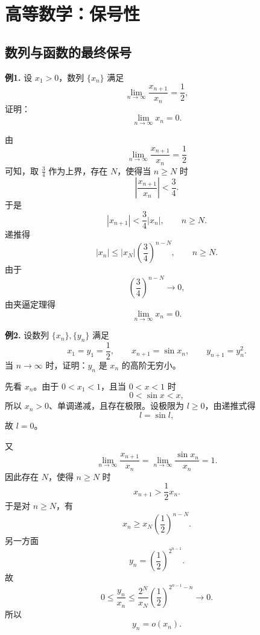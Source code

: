 \chapter{高等数学：保号性}

\section{数列与函数的最终保号}

\begin{problemblock}
\textbf{例1.} 设 \(x_1>0\)，数列 \(\{x_n\}\) 满足
\[
\lim_{n\to\infty}\frac{x_{n+1}}{x_n}=\frac12,
\]
证明：
\[
\lim_{n\to\infty}x_n=0.
\]
\end{problemblock}
\begin{solutionblock}
由
\[
\lim_{n\to\infty}\frac{x_{n+1}}{x_n}=\frac12
\]
可知，取 \(\frac34\) 作为上界，存在 \(N\)，使得当 \(n\ge N\) 时
\[
\left|\frac{x_{n+1}}{x_n}\right|<\frac34.
\]
于是
\[
|x_{n+1}|<\frac34|x_n|,\qquad n\ge N.
\]
递推得
\[
|x_n|\le |x_N|\left(\frac34\right)^{n-N},\qquad n\ge N.
\]
由于
\[
\left(\frac34\right)^{n-N}\to0,
\]
由夹逼定理得
\[
\lim_{n\to\infty}x_n=0.
\]
\end{solutionblock}

\begin{problemblock}
\textbf{例2.} 设数列 \(\{x_n\},\{y_n\}\) 满足
\[
x_1=y_1=\frac12,\qquad x_{n+1}=\sin x_n,\qquad y_{n+1}=y_n^2.
\]
当 \(n\to\infty\) 时，证明：\(y_n\) 是 \(x_n\) 的高阶无穷小。
\end{problemblock}
\begin{solutionblock}
先看 \(x_n\)。由于 \(0<x_1<1\)，且当 \(0<x<1\) 时
\[
0<\sin x<x,
\]
所以 \(x_n>0\)、单调递减，且存在极限。设极限为 \(l\ge0\)，由递推式得
\[
l=\sin l,
\]
故 \(l=0\)。

又
\[
\lim_{n\to\infty}\frac{x_{n+1}}{x_n}
=\lim_{n\to\infty}\frac{\sin x_n}{x_n}=1.
\]
因此存在 \(N\)，使得 \(n\ge N\) 时
\[
x_{n+1}>\frac12x_n.
\]
于是对 \(n\ge N\)，有
\[
x_n\ge x_N\left(\frac12\right)^{n-N}.
\]
另一方面
\[
y_n=\left(\frac12\right)^{2^{n-1}}.
\]
故
\[
0\le \frac{y_n}{x_n}
\le \frac{2^N}{x_N}\left(\frac12\right)^{2^{n-1}-n}\to0.
\]
所以
\[
y_n=o(x_n).
\]
\end{solutionblock}

